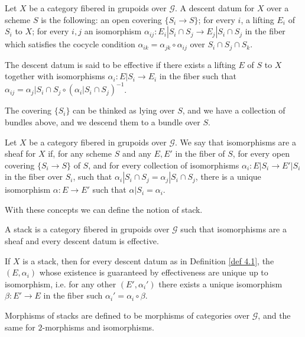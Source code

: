 \documentclass[
	oldfontcommands,
	sumario=abnt-6027-2012,
	12pt,			%
	openright,		%
	oneside,		%
	a4paper,		%
	english,		%
	brazil			%
	]{imecc-unicamp}
\begin{document}
\begin{definition}\label{def 4.1}
	Let $X$ be a category fibered in grupoids over $\mathcal G$. A descent datum for $X$ over a scheme $S$ is the following: an open covering $\{S_i\rightarrow S\}$; for every $i$, a lifting $E_i$ of $S_i$ to $X$; for every $i,j$ an isomorphism $\alpha_{ij}:E_i|S_i\cap S_j\rightarrow E_j|S_i\cap S_j$ in the fiber which satisfies the cocycle condition $\alpha_{ik}=\alpha_{jk}\circ\alpha_{ij}$ over $S_i\cap S_j\cap S_k$.
	
	The descent datum is said to be effective if there exists a lifting $E$ of $S$ to $X$ together with isomorphisms $\alpha_i:E|S_i\rightarrow E_i$ in the fiber such that $\alpha_{ij}=\alpha_j|S_{i}\cap S_j\circ(\alpha_i|S_{i}\cap S_j)^{-1}$.
\end{definition}

The covering $\{S_i\}$ can be thinked as lying over $S$, and we have a collection of bundles above, and we descend them to a bundle over $S$.

\begin{definition}
	Let $X$ be a category fibered in grupoids over $\mathcal G$. We say that isomorphisms are a sheaf for $X$ if, for any scheme $S$ and any $E,E'$ in the fiber of $S$, for every open covering $\{S_i\rightarrow S \}$ of $S$, and for every collection of isomorphisms $\alpha_i: E|S_i\rightarrow E'|S_i$ in the fiber over $S_i$, such that $\alpha_i|S_i\cap S_j=\alpha_j|S_i\cap S_j$, there is a unique isomorphism $\alpha:E\rightarrow E'$ such that $\alpha|S_i=\alpha_i$.
\end{definition}

With these concepts we can define the notion of stack.

\begin{definition}
	A stack is a category fibered in grupoids over $\mathcal G$ such that isomorphisms are a sheaf and every descent datum is effective.
\end{definition}

If $X$ is a stack, then for every descent datum as in Definition \ref{def 4.1}, the $(E,\alpha_i)$ whose existence is guaranteed by effectiveness are unique up to isomorphism, i.e. for any other $(E',\alpha_i')$ there exists a unique isomorphism $\beta:E'\rightarrow E$ in the fiber such $\alpha_i'=\alpha_i\circ \beta$. 

Morphisms of stacks are defined to be morphisms of categories over $\mathcal G$, and the same for $2$-morphisms and isomorphisms.
\end{document}
